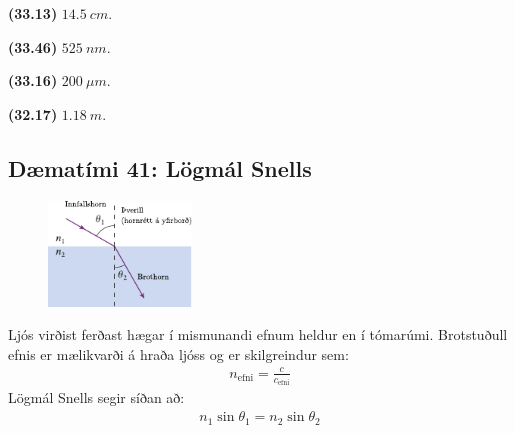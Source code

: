\begin{tcolorbox}
\begin{enumerate*}[label = ]
  \item \textbf{(33.13)} $\SI{14.5}{cm}$.
  \item \textbf{(33.46)} $\SI{525}{nm}$.
  \item \textbf{(33.16)} $\SI{200}{\mu m}$.
  \item \textbf{(32.17)} $\SI{1.18}{m}$.
\end{enumerate*}
\end{tcolorbox}

\newpage

\subsection*{Dæmatími 41: Lögmál Snells}

\begin{tcolorbox}
\begin{minipage}{\linewidth}
\begin{figure}
\includegraphics[width = 1.5in]{figures/snell.pdf}
\end{figure}
Ljós virðist ferðast hægar í mismunandi efnum heldur en í tómarúmi. Brotstuðull efnis er mælikvarði á hraða ljóss og er skilgreindur sem:
\begin{align*}
    n_{\text{efni}} = \frac{c}{c_{\text{efni}}}
\end{align*}
Lögmál Snells segir síðan að:
\begin{align*}
    n_1 \sin\theta_1 = n_2 \sin\theta_2
\end{align*}
\end{minipage}
\end{tcolorbox}

